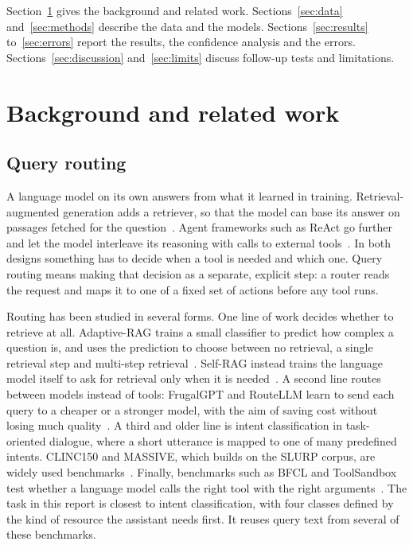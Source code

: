 \documentclass[conference]{IEEEtran}
\begin{document}
Section~\ref{sec:background} gives the background and related work. Sections~\ref{sec:data} and~\ref{sec:methods} describe the data and the models. Sections~\ref{sec:results} to~\ref{sec:errors} report the results, the confidence analysis and the errors. Sections~\ref{sec:discussion} and~\ref{sec:limits} discuss follow-up tests and limitations.

\section{Background and related work}\label{sec:background}

\subsection{Query routing}
A language model on its own answers from what it learned in training. Retrieval-augmented generation adds a retriever, so that the model can base its answer on passages fetched for the question~\cite{rag}. Agent frameworks such as ReAct go further and let the model interleave its reasoning with calls to external tools~\cite{react}. In both designs something has to decide when a tool is needed and which one. Query routing means making that decision as a separate, explicit step: a router reads the request and maps it to one of a fixed set of actions before any tool runs.

Routing has been studied in several forms. One line of work decides whether to retrieve at all. Adaptive-RAG trains a small classifier to predict how complex a question is, and uses the prediction to choose between no retrieval, a single retrieval step and multi-step retrieval~\cite{adaptive-rag}. Self-RAG instead trains the language model itself to ask for retrieval only when it is needed~\cite{self-rag}. A second line routes between models instead of tools: FrugalGPT and RouteLLM learn to send each query to a cheaper or a stronger model, with the aim of saving cost without losing much quality~\cite{frugalgpt,routellm}. A third and older line is intent classification in task-oriented dialogue, where a short utterance is mapped to one of many predefined intents. CLINC150 and MASSIVE, which builds on the SLURP corpus, are widely used benchmarks~\cite{clinc150,massive-en-us,slurp}. Finally, benchmarks such as BFCL and ToolSandbox test whether a language model calls the right tool with the right arguments~\cite{bfcl-v3,toolsandbox}. The task in this report is closest to intent classification, with four classes defined by the kind of resource the assistant needs first. It reuses query text from several of these benchmarks.
\end{document}
